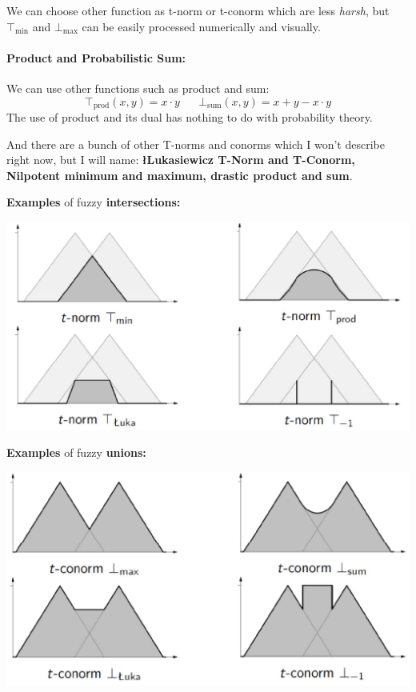 We can choose other function as t-norm or t-conorm which are less \textit{harsh}, but $\top_{\min}$ and $\bot_{\max}$ can be easily processed numerically and visually.\\

\paragraph{Product and Probabilistic Sum:} We can use other functions such as product and sum: 
$$ \top_{\text{prod}} (x,y) = x \cdot y \;\;\;\;\;\; \bot_{\text{sum}} (x,y) = x + y - x \cdot y $$
The use of product and its dual has nothing to do with probability theory.\\

\vfill 

And there are a bunch of other T-norms and conorms which I won't describe right now, but I will name: \textbf{\l{L}ukasiewicz T-Norm and T-Conorm, Nilpotent minimum and maximum, drastic product and sum}.

\newpage

\textbf{Examples} of fuzzy \textbf{intersections:}
\begin{center}
	\includegraphics[width=0.9\columnwidth]{img/FS/fint}
\end{center}

\textbf{Examples} of fuzzy \textbf{unions:}
\begin{center}
	\includegraphics[width=0.9\columnwidth]{img/FS/funion}
\end{center}


